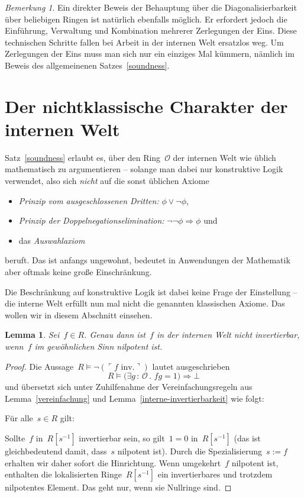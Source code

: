 \documentclass[a4paper,ngerman,12pt]{scrartcl}
\theoremstyle{definition}
\theoremstyle{plain}
\newtheorem{lemma}[defn]{Lemma}
\theoremstyle{remark}
\newtheorem{bem}[defn]{Bemerkung}
\renewcommand{\O}{\mathcal{O}}
\renewcommand{\_}{\mathpunct{.}\,}
\newcommand{\?}{\,{:}\,}
\newcommand{\speak}[1]{\ulcorner\text{#1}\urcorner}
\newenvironment{indentblock}{%
  \list{}{\leftmargin\leftmargin}%
  \item\relax
}{%
  \endlist
}
\begin{document}
\begin{bem}Ein direkter Beweis der Behauptung über die Diagonalisierbarkeit
über beliebigen Ringen ist natürlich ebenfalls möglich. Er erfordert jedoch
die Einführung, Verwaltung und Kombination mehrerer Zerlegungen der Eins. Diese
technischen Schritte fallen bei Arbeit in der internen Welt ersatzlos weg. Um
Zerlegungen der Eins muss man sich nur ein einziges Mal kümmern, nämlich im
Beweis des allgemeinenen Satzes~\ref{soundness}.\end{bem}


\section{Der nichtklassische Charakter der internen Welt}

Satz~\ref{soundness} erlaubt es, über den Ring~$\O$ der internen Welt
wie üblich mathematisch zu argumentieren -- solange man dabei nur konstruktive
Logik verwendet, also sich \emph{nicht} auf die sonst üblichen Axiome
\begin{itemize}
\item \emph{Prinzip vom ausgeschlossenen Dritten:} $\phi \vee \neg\phi$,
\item \emph{Prinzip der Doppelnegationselimination:} $\neg\neg\phi \Rightarrow
\phi$ und
\item das \emph{Auswahlaxiom}
\end{itemize}
beruft. Das ist anfangs ungewohnt, bedeutet in Anwendungen der Mathematik aber
oftmals keine große Einschränkung.

Die Beschränkung auf konstruktive Logik ist dabei keine Frage der Einstellung
-- die interne Welt erfüllt nun mal nicht die genannten klassischen Axiome. Das
wollen wir in diesem Abschnitt einsehen.

\begin{lemma}Sei~$f \in R$. Genau dann ist~$f$ in der internen Welt nicht
invertierbar, wenn~$f$ im gewöhnlichen Sinn nilpotent ist.\end{lemma}
\begin{proof}Die Aussage~$R \models \neg(\speak{$f$ inv.})$ lautet ausgeschrieben
\[ R \models \bigl(\exists g\?\O\_ fg = 1\bigr) \Rightarrow \bot \]
und übersetzt sich unter Zuhilfenahme der Vereinfachungsregeln aus Lemma~\ref{vereinfachung}
und Lemma~\ref{interne-invertierbarkeit} wie folgt:
\begin{indentblock}
Für alle~$s \in R$ gilt:
\begin{indentblock}
Sollte~$f$ in~$R[s^{-1}]$ invertierbar sein, so gilt~$1 = 0$ in~$R[s^{-1}]$
(das ist gleichbedeutend damit, dass~$s$ nilpotent ist).
\end{indentblock}
\end{indentblock}
Durch die Spezialisierung~$s := f$ erhalten wir daher sofort die Hinrichtung.
Wenn umgekehrt~$f$ nilpotent ist, enthalten die lokalisierten Ringe~$R[s^{-1}]$
ein invertierbares und trotzdem nilpotentes Element. Das geht nur, wenn sie
Nullringe sind.
\end{proof}
\end{document}
